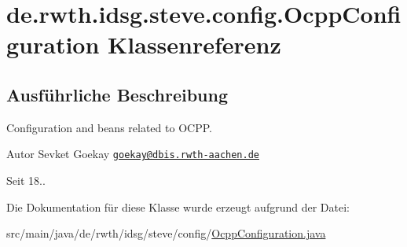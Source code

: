 \hypertarget{classde_1_1rwth_1_1idsg_1_1steve_1_1config_1_1_ocpp_configuration}{\section{de.\+rwth.\+idsg.\+steve.\+config.\+Ocpp\+Configuration Klassenreferenz}
\label{classde_1_1rwth_1_1idsg_1_1steve_1_1config_1_1_ocpp_configuration}
}


\subsection{Ausführliche Beschreibung}
Configuration and beans related to O\+C\+P\+P.

\begin{DoxyAuthor}{Autor}
Sevket Goekay \href{mailto:goekay@dbis.rwth-aachen.de}{\tt goekay@dbis.\+rwth-\/aachen.\+de} 
\end{DoxyAuthor}
\begin{DoxySince}{Seit}
18.. 
\end{DoxySince}


Die Dokumentation für diese Klasse wurde erzeugt aufgrund der Datei\+:\begin{DoxyCompactItemize}
\item 
src/main/java/de/rwth/idsg/steve/config/\hyperlink{_ocpp_configuration_8java}{Ocpp\+Configuration.\+java}\end{DoxyCompactItemize}
